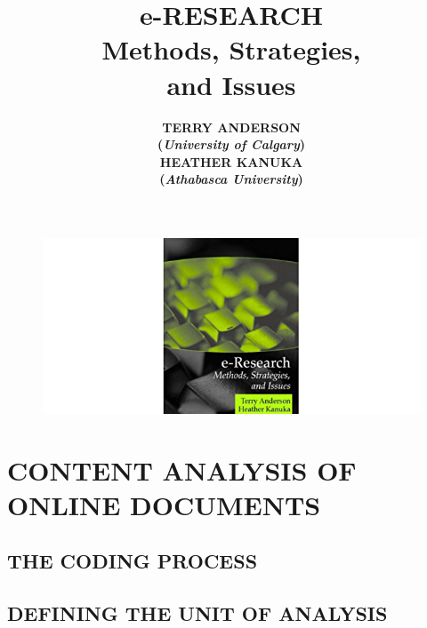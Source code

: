 \documentclass[a4paper,twoside,11pt]{book}
\begin{document}
\parindent 27pt

\title{\Huge\bf{e-RESEARCH\\Methods, Strategies, \\and Issues}}
\author{\Large\bf{TERRY ANDERSON}\\ (\emph{University of Calgary}) \\ \Large\bf{HEATHER KANUKA}\\(\emph{Athabasca University})}
\maketitle
\begin{figure}
\centering
 \includegraphics[scale=1]{image/introduction/eresearch}
\end{figure}

\tableofcontents
\let\cleardoublepage\clearpage

\chapter{CONTENT ANALYSIS OF ONLINE DOCUMENTS}
\section{THE CODING PROCESS}
\section{DEFINING THE UNIT OF ANALYSIS}
\end{document}
